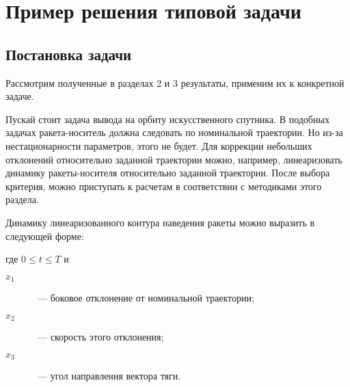 


\chapter{Пример решения типовой задачи}
\renewcommand{\optU}{  \optimum{\m{u}} } %
\renewcommand{\funcF}{ \calf{F}        } %
\renewcommand{\funcS}{ \calf{S}        } %



\section{Постановка задачи}



Рассмотрим полученные в разделах 2 и 3 результаты, применим их к конкретной задаче.

Пускай стоит задача вывода на орбиту искусственного спутника. В подобных задачах ракета-носитель должна следовать по номинальной траектории. Но из-за нестационарности параметров, этого не будет. Для коррекции небольших отклонений относительно заданной траектории можно, например, линеаризовать динамику ракеты-носителя относительно заданной траектории. После выбора критерия, можно приступать к расчетам в соответствии с методиками этого раздела.

Динамику линеаризованного контура наведения ракеты можно выразить в следующей форме:

\eeq

где $0 \leqslant t \leqslant T$ и

\begin{description}
	\item[$x_1$]~--- боковое отклонение от номинальной траектории;
	\item[$x_2$]~--- скорость этого отклонения;
	\item[$x_3$]~--- угол направления вектора тяги.
\end{description}

